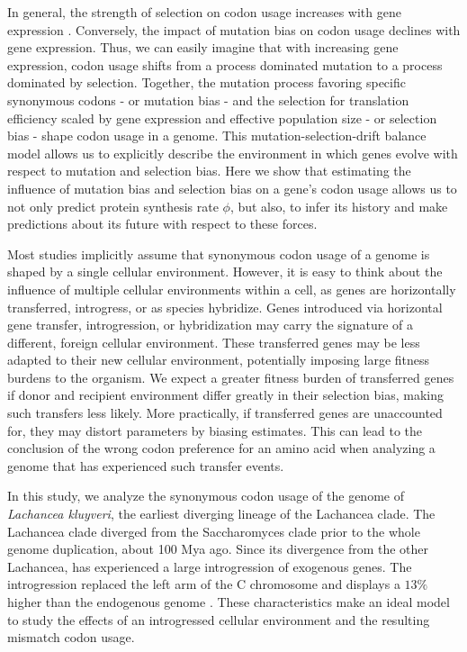 \documentclass[12pt]{article}
\begin{document}
In general, the strength of selection on codon usage increases with gene expression \citep{ikemura1985, gouy1982}.
Conversely, the impact of mutation bias on codon usage declines with gene expression.
Thus, we can easily imagine that with increasing gene expression, codon usage shifts from a process dominated mutation to a process dominated by selection.
Together, the mutation process favoring specific synonymous codons - or mutation bias -  and the selection for translation efficiency scaled by gene expression and effective population size - or selection bias -  shape codon usage in a genome.
This mutation-selection-drift balance model allows us to explicitly describe the environment in which genes evolve with respect to mutation and selection bias.
Here we show that estimating the influence of mutation bias and selection bias on a gene's codon usage allows us to not only predict protein synthesis rate $\phi$, but also, to infer its history and make predictions about its future with respect to these forces.

Most studies implicitly assume that synonymous codon usage of a genome is shaped by a single cellular environment. 
However, it is easy to think about the influence of multiple cellular environments within a cell, as genes are horizontally transferred, introgress, or as species hybridize.
Genes introduced via horizontal gene transfer, introgression, or hybridization may carry the signature of a different, foreign cellular environment.
These transferred genes may be less adapted to their new cellular environment, potentially imposing large fitness burdens to the organism.
We expect a greater fitness burden of transferred genes if donor and recipient environment differ greatly in their selection bias, making such transfers less likely.
More practically, if transferred genes are unaccounted for, they may distort parameters by biasing estimates.
This can lead to the conclusion of the wrong codon preference for an amino acid when analyzing a genome that has experienced such transfer events.  

In this study, we analyze the synonymous codon usage of the genome of \textit{Lachancea kluyveri}, the earliest diverging lineage of the Lachancea clade.
The Lachancea clade diverged from the Saccharomyces clade prior to the whole genome duplication, about 100 Mya ago.
Since its divergence from the other Lachancea, \kluyveri  has experienced a large introgression of exogenous genes.
The introgression replaced the left arm of the C chromosome and displays a $13 \%$ higher \GC than the endogenous \kluyveri genome \citep{payen2009, friedrich2015}.
These characteristics make \kluyveri an ideal model to study the effects of an introgressed cellular environment and the resulting mismatch codon usage.
\end{document}
